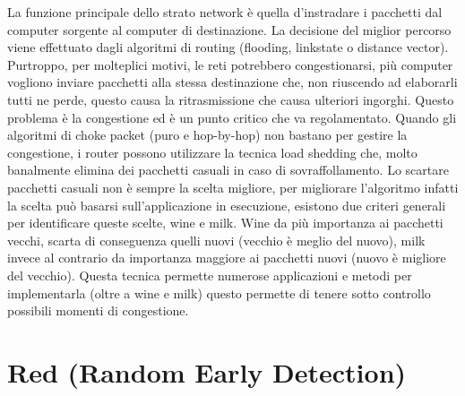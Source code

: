 La funzione principale dello strato network è quella d’instradare i pacchetti dal computer sorgente al computer di destinazione. La decisione del miglior percorso viene effettuato dagli algoritmi di routing (flooding, linkstate o distance vector). Purtroppo, per molteplici motivi, le reti potrebbero congestionarsi, più computer vogliono inviare pacchetti alla stessa destinazione che, non riuscendo ad elaborarli tutti ne perde, questo causa la ritrasmissione che causa ulteriori ingorghi. Questo problema è la congestione ed è un punto critico che va regolamentato.
Quando gli algoritmi di choke packet (puro e hop-by-hop) non bastano per gestire la congestione, i router possono utilizzare la tecnica load shedding che, molto banalmente elimina dei pacchetti casuali in caso di sovraffollamento.
Lo scartare pacchetti casuali non è sempre la scelta migliore, per migliorare l’algoritmo infatti la scelta può basarsi sull’applicazione in esecuzione, esistono due criteri generali per identificare queste scelte, wine e milk.
Wine da più importanza ai pacchetti vecchi, scarta di conseguenza quelli nuovi (vecchio è meglio del nuovo), milk invece al contrario da importanza maggiore ai pacchetti nuovi (nuovo è migliore del vecchio).
Questa tecnica permette numerose applicazioni e metodi per implementarla (oltre a wine e milk) questo permette di tenere sotto controllo possibili momenti di congestione.

\section{Red (Random Early Detection)}

